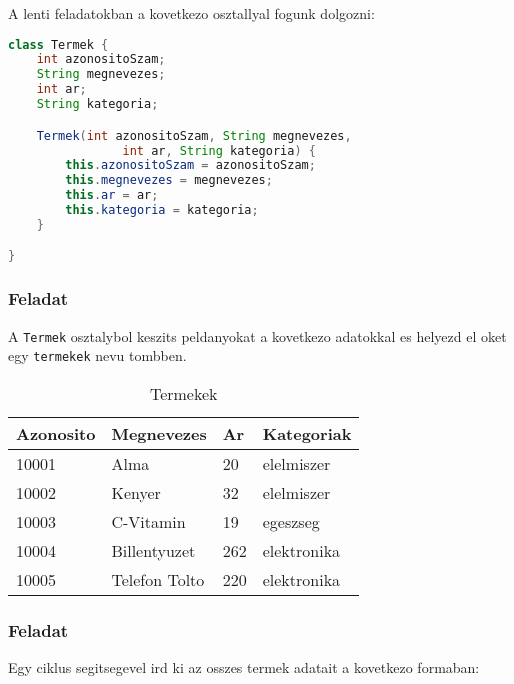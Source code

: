 \documentclass{article}
\let\l\lstinline
\begin{document}
A lenti feladatokban a kovetkezo osztallyal fogunk dolgozni:

\begin{lstlisting}[language=Java, caption=Feladat - Termek osztaly]
class Termek {
    int azonositoSzam;
    String megnevezes;
    int ar;
    String kategoria;

    Termek(int azonositoSzam, String megnevezes,
                int ar, String kategoria) {
        this.azonositoSzam = azonositoSzam;
        this.megnevezes = megnevezes;
        this.ar = ar;
        this.kategoria = kategoria;
    }

}

\end{lstlisting}

\subsubsection{Feladat}
A \l{Termek} osztalybol keszits peldanyokat a kovetkezo adatokkal es helyezd el oket egy \l{termekek} nevu tombben.

\begin{table}[H]
    \begin{tabular}{|l|l|l|l|}
        \hline
        \textbf{Azonosito} & \textbf{Megnevezes} & \textbf{Ar} & \textbf{Kategoriak}    \\ \hline
        10001              & Alma                & 20          & elelmiszer             \\ \hline
        10002              & Kenyer              & 32          & elelmiszer             \\ \hline
        10003              & C-Vitamin           & 19          & egeszseg               \\ \hline
        10004              & Billentyuzet        & 262         & elektronika            \\ \hline
        10005              & Telefon Tolto       & 220         & elektronika            \\ \hline
    \end{tabular}
    \caption{Termekek}
    \label{tab:termekek}
\end{table}

\newpage

\subsubsection{Feladat}

Egy ciklus segitsegevel ird ki az osszes termek adatait a kovetkezo formaban:
\end{document}
